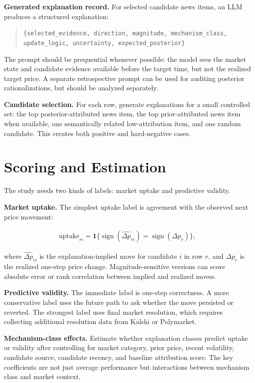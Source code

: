 \documentclass[11pt]{article}
\begin{document}
\textbf{Generated explanation record.} For selected candidate news items, an LLM produces a structured explanation:

\begin{quote}
\small
\texttt{\{selected\_evidence, direction, magnitude, mechanism\_class,}\\
\texttt{update\_logic, uncertainty, expected\_posterior\}}
\end{quote}

The prompt should be prequential whenever possible: the model sees the market state and candidate evidence available before the target time, but not the realized target price. A separate retrospective prompt can be used for auditing posterior rationalizations, but should be analyzed separately.

\textbf{Candidate selection.} For each row, generate explanations for a small controlled set: the top posterior-attributed news item, the top prior-attributed news item when available, one semantically related low-attribution item, and one random candidate. This creates both positive and hard-negative cases.

\section{Scoring and Estimation}
The study needs two kinds of labels: market uptake and predictive validity.

\textbf{Market uptake.} The simplest uptake label is agreement with the observed next price movement:

\begin{align}
\text{uptake}_{ri} = \mathbf{1}\{\operatorname{sign}(\widehat{\Delta p}_{ri}) = \operatorname{sign}(\Delta p_r)\},
\end{align}

where $\widehat{\Delta p}_{ri}$ is the explanation-implied move for candidate $i$ in row $r$, and $\Delta p_r$ is the realized one-step price change. Magnitude-sensitive versions can score absolute error or rank correlation between implied and realized moves.

\textbf{Predictive validity.} The immediate label is one-step correctness. A more conservative label uses the future path to ask whether the move persisted or reverted. The strongest label uses final market resolution, which requires collecting additional resolution data from Kalshi or Polymarket.

\textbf{Mechanism-class effects.} Estimate whether explanation classes predict uptake or validity after controlling for market category, prior price, recent volatility, candidate source, candidate recency, and baseline attribution score. The key coefficients are not just average performance but interactions between mechanism class and market context.
\end{document}
